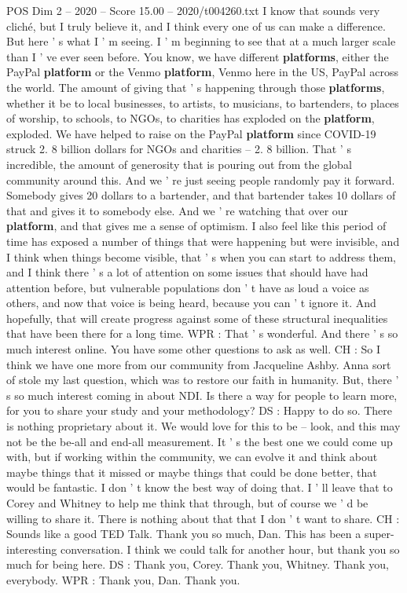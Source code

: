 \begin{textsample}{POS Dim 2 – 2020 – Score 15.00 – 2020/t004260.txt}
I know that sounds very cliché, but I truly believe it, and I think every one of us can make a difference.
But here ' s what I ' m seeing.
I ' m beginning to see that at a much larger scale than I ' ve ever seen before.
You know, we have different \textbf{platforms}, either the PayPal \textbf{platform} or the Venmo \textbf{platform}, Venmo here in the US, PayPal across the world.
The amount of giving that ' s happening through those \textbf{platforms}, whether it be to local businesses, to artists, to musicians, to bartenders, to places of worship, to schools, to NGOs, to charities has exploded on the \textbf{platform}, exploded.
We have helped to raise on the PayPal \textbf{platform} since COVID-19 struck 2. 8 billion dollars for NGOs and charities -- 2. 8 billion.
That ' s incredible, the amount of generosity that is pouring out from the global community around this.
And we ' re just seeing people randomly pay it forward.
Somebody gives 20 dollars to a bartender, and that bartender takes 10 dollars of that and gives it to somebody else.
And we ' re watching that over our \textbf{platform}, and that gives me a sense of optimism.
I also feel like this period of time has exposed a number of things that were happening but were invisible, and I think when things become visible, that ' s when you can start to address them, and I think there ' s a lot of attention on some issues that should have had attention before, but vulnerable populations don ' t have as loud a voice as others, and now that voice is being heard, because you can ' t ignore it.
And hopefully, that will create progress against some of these structural inequalities that have been there for a long time.
WPR : That ' s wonderful.
And there ' s so much interest online.
You have some other questions to ask as well.
CH : So I think we have one more from our community from Jacqueline Ashby.
Anna sort of stole my last question, which was to restore our faith in humanity.
But, there ' s so much interest coming in about NDI.
Is there a way for people to learn more, for you to share your study and your methodology?
DS : Happy to do so.
There is nothing proprietary about it.
We would love for this to be -- look, and this may not be the be-all and end-all measurement.
It ' s the best one we could come up with, but if working within the community, we can evolve it and think about maybe things that it missed or maybe things that could be done better, that would be fantastic.
I don ' t know the best way of doing that.
I ' ll leave that to Corey and Whitney to help me think that through, but of course we ' d be willing to share it.
There is nothing about that that I don ' t want to share.
CH : Sounds like a good TED Talk.
Thank you so much, Dan.
This has been a super-interesting conversation.
I think we could talk for another hour, but thank you so much for being here.
DS : Thank you, Corey.
Thank you, Whitney.
Thank you, everybody.
WPR : Thank you, Dan.
Thank you.

\end{textsample}
